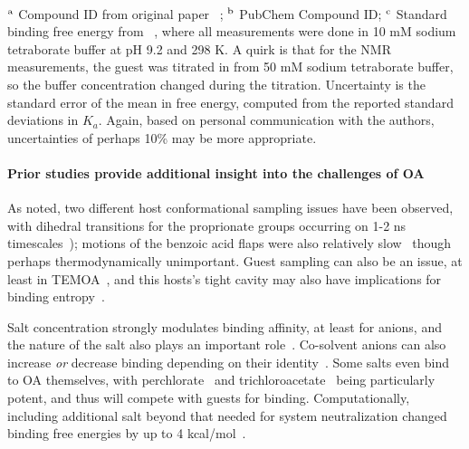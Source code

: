 \documentclass[aps,pre,twocolumn,nofootinbib,superscriptaddress,10pt, final,tightenlines]{revtex4-1}
\begin{document}
\begin{table}
\begin{tabular}{@{}| c | c | c | c | c | c | c | @{}}
\hline
\end{tabular}\\
$^{\rm a}$ Compound ID from original paper ~\cite{gibb_binding_2013}; $^{\rm b}$ PubChem Compound ID; $^{\rm c}$ Standard binding free energy from ~\cite{gibb_binding_2013}, where all measurements were done in 10 mM sodium tetraborate buffer at pH 9.2 and 298 K. A quirk is that for the NMR measurements, the guest was titrated in from 50 mM sodium tetraborate buffer, so the buffer concentration changed during the titration. Uncertainty is the standard error of the mean in free energy, computed from the reported standard deviations in $K_a$. Again, based on personal communication with the authors, uncertainties of perhaps 10\% may be more appropriate.
\end{table}
\endgroup

\paragraph{Prior studies provide additional insight into the challenges of OA}

As noted, two different host conformational sampling issues have been observed, with dihedral transitions for the proprionate groups occurring on 1-2 ns timescales~\cite{mikulskis_free-energy_2014}); motions of the benzoic acid flaps were also relatively slow~\cite{yin_sampl5_2016, tofoleanu_absolute_2016} though perhaps thermodynamically unimportant. 
Guest sampling can also be an issue, at least in TEMOA~\cite{yin_sampl5_preprint}, and this hosts's tight cavity may also have implications for binding entropy~\cite{yin_sampl5_2016}.

Salt concentration strongly modulates binding affinity, at least for anions, and the nature of the salt also plays an important role~\cite{carnegie_anion_2014}. 
Co-solvent anions can also increase \emph{or} decrease binding depending on their identity~\cite{gibb_anion_2011}. 
Some salts even bind to OA themselves, with perchlorate~\cite{gibb_anion_2011} and trichloroacetate~\cite{sokkalingam_binding_2016} being particularly potent, and thus will compete with guests for binding.  
Computationally, including additional salt beyond that needed for system neutralization changed binding free energies by up to 4 kcal/mol~\cite{tofoleanu_absolute_2016}.  
\end{document}
